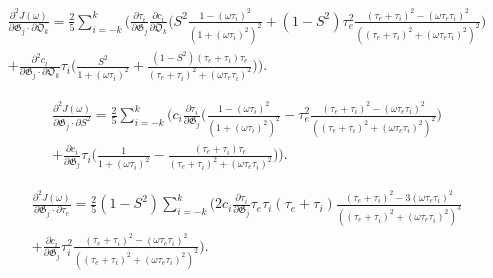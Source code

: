 \documentclass[a4paper,11pt,twoside,openright]{book}
\def\lthtmlcheckvsize{\ifdim\ht\sizebox<\vsize 
  \ifdim\wd\sizebox<\hsize\expandafter\hfill\fi \expandafter\vfill
  \else\expandafter\vss\fi}%
\begin{document}
{\newpage\clearpage
{}%
\begin{multline}
    \frac{\partial^2 J(\omega)}{\partial \mathfrak{G}_j \cdot \partial \mathfrak{O}_k} = \frac{2}{5} \sum_{i=-k}^k \Bigg(
        \frac{\partial \tau_i}{\partial \mathfrak{G}_j} \frac{\partial c_i}{\partial \mathfrak{O}_k} \Bigg(
            S^2 \frac{1 - (\omega \tau_i)^2}{\left(1 + (\omega \tau_i)^2 \right)^2}
            + (1 - S^2) \tau_e^2 \frac{(\tau_e + \tau_i)^2 - (\omega \tau_e \tau_i)^2}{\left((\tau_e + \tau_i)^2 + (\omega \tau_e \tau_i)^2 \right)^2}
        \Bigg) \\
        +  \frac{\partial^2 c_i}{\partial \mathfrak{G}_j \cdot \partial \mathfrak{O}_k} \tau_i \Bigg(
            \frac{S^2}{1 + (\omega \tau_i)^2}
            + \frac{(1 - S^2)(\tau_e + \tau_i)\tau_e}{(\tau_e + \tau_i)^2 + (\omega \tau_e \tau_i)^2}
        \Bigg)
    \Bigg).
\end{multline}%
\lthtmldisplayZ
\lthtmlcheckvsize\clearpage}

{\newpage\clearpage
{}%
\begin{multline}
    \frac{\partial^2 J(\omega)}{\partial \mathfrak{G}_j \cdot \partial S^2} = \frac{2}{5} \sum_{i=-k}^k \Bigg(
        c_i \frac{\partial \tau_i}{\partial \mathfrak{G}_j} \Bigg(
            \frac{1 - (\omega \tau_i)^2}{\left(1 + (\omega \tau_i)^2 \right)^2}
            - \tau_e^2 \frac{(\tau_e + \tau_i)^2 - (\omega \tau_e \tau_i)^2}{\left((\tau_e + \tau_i)^2 + (\omega \tau_e \tau_i)^2 \right)^2}
        \Bigg) \\
        +  \frac{\partial c_i}{\partial \mathfrak{G}_j} \tau_i \Bigg(
            \frac{1}{1 + (\omega \tau_i)^2}
            - \frac{(\tau_e + \tau_i)\tau_e}{(\tau_e + \tau_i)^2 + (\omega \tau_e \tau_i)^2}
        \Bigg)
    \Bigg).
\end{multline}%
\lthtmldisplayZ
\lthtmlcheckvsize\clearpage}

{\newpage\clearpage
{}%
\begin{multline}
    \frac{\partial^2 J(\omega)}{\partial \mathfrak{G}_j \cdot \partial \tau_e} = \frac{2}{5} (1 - S^2) \sum_{i=-k}^k \Bigg(
        2 c_i \frac{\partial \tau_i}{\partial \mathfrak{G}_j} \tau_e \tau_i (\tau_e + \tau_i)
            \frac{(\tau_e + \tau_i)^2 - 3(\omega \tau_e \tau_i)^2}{\left((\tau_e + \tau_i)^2 + (\omega \tau_e \tau_i)^2 \right)^3}  \\
        + \frac{\partial c_i}{\partial \mathfrak{G}_j} \tau_i^2 \frac{(\tau_e + \tau_i)^2 - (\omega \tau_e \tau_i)^2}{\left((\tau_e + \tau_i)^2 + (\omega \tau_e \tau_i)^2 \right)^2}
    \Bigg).
\end{multline}%
\lthtmldisplayZ
\lthtmlcheckvsize\clearpage}
\end{document}
